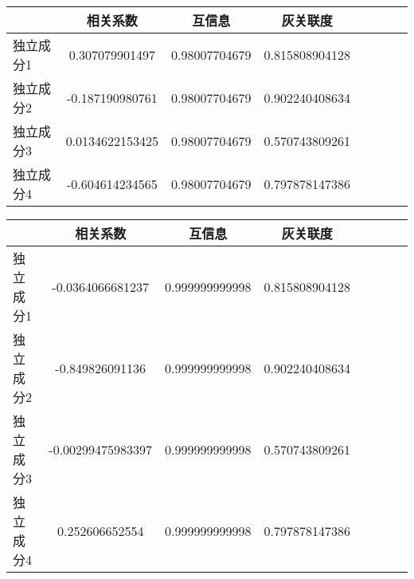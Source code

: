 
\begin{table}[!tphb] 
\begin{center}
\begin{tabular}{lccclccc} 
 \toprule 
& 相关系数   & 互信息    &灰关联度 \\ 
\midrule 
独立成分1	& 0.307079901497	& 0.98007704679	& 0.815808904128	\\ 
独立成分2	& -0.187190980761	& 0.98007704679	& 0.902240408634	\\ 
独立成分3	& 0.0134622153425	& 0.98007704679	& 0.570743809261	\\ 
独立成分4	& -0.604614234565	& 0.98007704679	& 0.797878147386	\\ 
\bottomrule 
 \end{tabular} 
\end{center} 
 \end{table} 


\begin{table}[!tphb] 
\begin{center}
\begin{tabular}{lccclccc} 
 \toprule 
& 相关系数   & 互信息    &灰关联度 \\ 
\midrule 
独立成分1	& -0.0364066681237	& 0.999999999998	& 0.815808904128	\\ 
独立成分2	& -0.849826091136	& 0.999999999998	& 0.902240408634	\\ 
独立成分3	& -0.00299475983397	& 0.999999999998	& 0.570743809261	\\ 
独立成分4	& 0.252606652554	& 0.999999999998	& 0.797878147386	\\ 
\bottomrule 
 \end{tabular} 
\end{center} 
 \end{table} 


